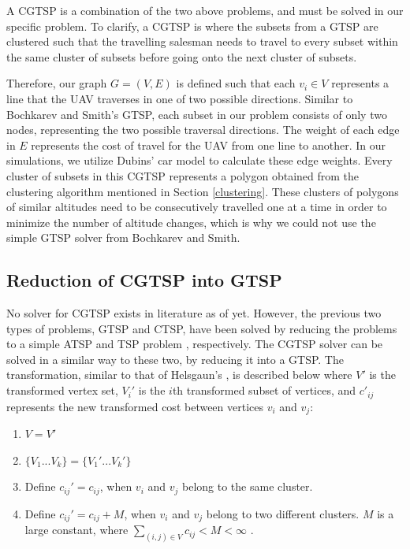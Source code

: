\documentclass[conference]{IEEEtran}
\theoremstyle{plain}%
\begin{document}
A CGTSP is a combination of the two above problems, and must be solved in our specific problem. To clarify, a CGTSP is where the subsets from a GTSP are clustered such that the travelling salesman needs to travel to every subset within the same cluster of subsets before going onto the next cluster of subsets.

Therefore, our graph $G = (V, E)$ is defined such that each $v_i \in V$ represents a line that the UAV traverses in one of two possible directions. Similar to Bochkarev and Smith's GTSP, each subset in our problem consists of only two nodes, representing the two possible traversal directions. The weight of each edge in $E$ represents the cost of travel for the UAV from one line to another. In our simulations, we utilize Dubins' car model to calculate these edge weights. Every cluster of subsets in this CGTSP represents a polygon obtained from the clustering algorithm mentioned in Section \ref{clustering}. These clusters of polygons of similar altitudes need to be consecutively travelled one at a time in order to minimize the number of altitude changes, which is why we could not use the simple GTSP solver from Bochkarev and Smith.

\subsection{Reduction of CGTSP into GTSP}

No solver for CGTSP exists in literature as of yet. However, the previous two types of problems, GTSP and CTSP, have been solved by reducing the problems to a simple ATSP \cite{helsgaun2015solving} and TSP problem \cite{helsgaun2011solving}, respectively. The CGTSP solver can be solved in a similar way to these two, by reducing it into a GTSP. The transformation, similar to that of Helsgaun's \cite{helsgaun2011solving}, is described below where $V'$ is the transformed vertex set, $V_i'$ is the $i$th transformed subset of vertices, and $c'_{ij}$ represents the new transformed cost between vertices $v_i$ and $v_j$:

\begin{enumerate}[label=(\alph*)]
\item $V = V'$
\item $\{V_1...V_k\} = \{V_1'...V_k'\}$
\item Define $c_{ij}' = c_{ij}$, when $v_i$ and $v_j$ belong to the same cluster.
\item Define $c_{ij}' = c_{ij} + M$, when $v_i$ and $v_j$ belong to two different clusters. $M$ is a large constant, where $\sum_{(i,j) \in V} c_{ij} < M < \infty$ \cite{noon1993efficient}.
\end{enumerate}
\end{document}
